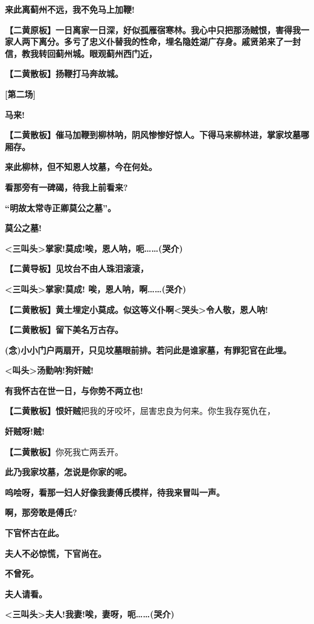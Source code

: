 \textbf{来此离蓟州不远，我不免马上加鞭!}

\textbf{【二黄原板】一日离家一日深，好似孤雁宿寒林。我心中只把那汤贼恨，害得我一家人两下离分。多亏了忠义仆替我的性命，埋名隐姓湖广存身。戚贤弟来了一封信，教我转回蓟州城。眼观蓟州西门近，}

\textbf{【二黄散板】扬鞭打马奔故城。}

\textbf{{[}第二场{]}}

\textbf{马来!}

\textbf{【二黄散板】催马加鞭到柳林呐，阴风惨惨好惊人。下得马来柳林进，掌家坟墓哪厢存。}

\textbf{来此柳林，但不知恩人坟墓，今在何处。}

\textbf{看那旁有一碑碣，待我上前看来?}

\textbf{``明故太常寺正卿莫公之墓''。}

\textbf{莫公之墓!}

\textbf{\textless{}三叫头\textgreater{}掌家!莫成!唉，恩人呐，呃\ldots{}\ldots{}(哭介)}

\textbf{【二黄导板】见坟台不由人珠泪滚滚，}

\textbf{\textless{}三叫头\textgreater{}掌家!莫成!
唉，恩人呐，啊\ldots{}\ldots{}(哭介)}

\textbf{【二黄散板】黄土埋定小莫成。似这等义仆啊\textless{}哭头\textgreater{}令人敬，恩人呐!}

\textbf{【二黄散板】留下美名万古存。}

\textbf{(念)小小门户两扇开，只见坟墓眼前排。若问此是谁家墓，有罪犯官在此埋。}

\textbf{\textless{}叫头\textgreater{}汤勤呐!狗奸贼!}

\textbf{有我怀古在世一日，与你势不两立也!}

\textbf{【二黄散板】恨奸贼}把我的牙咬坏，屈害忠良为何来。你生我存冤仇在，

\textbf{奸贼呀!贼!}

\textbf{【二黄散板】}你死我亡两丢开。

\textbf{此乃我家坟墓，怎说是你家的呢。}

\textbf{呜哙呀，看那一妇人好像我妻傅氏模样，待我来冒叫一声。}

\textbf{啊，那旁敢是傅氏?}

\textbf{下官怀古在此。}

\textbf{夫人不必惊慌，下官尚在。}

\textbf{不曾死。}

\textbf{夫人请看。}

\textbf{\textless{}三叫头\textgreater{}夫人!我妻!唉，妻呀，呃\ldots{}\ldots{}(哭介)}

